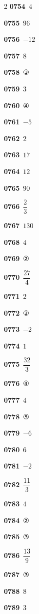 \documentclass[10pt,a4paper]{article}
\begin{document}
\begin{multicols}{2}
\noindent\textbf{0754}\ $4$\par
\noindent\textbf{0755}\ $96$\par
\noindent\textbf{0756}\ $-12$\par
\noindent\textbf{0757}\ $8$\par
\noindent\textbf{0758}\ ③\par
\noindent\textbf{0759}\ $3$\par
\noindent\textbf{0760}\ ④\par
\noindent\textbf{0761}\ $-5$\par
\noindent\textbf{0762}\ $2$\par
\noindent\textbf{0763}\ $17$\par
\noindent\textbf{0764}\ $12$\par
\noindent\textbf{0765}\ $90$\par
\noindent\textbf{0766}\ $\dfrac{2}{3}$\par
\noindent\textbf{0767}\ $130$\par
\noindent\textbf{0768}\ $4$\par
\noindent\textbf{0769}\ ②\par
\noindent\textbf{0770}\ $\dfrac{27}{4}$\par
\noindent\textbf{0771}\ $2$\par
\noindent\textbf{0772}\ ②\par
\noindent\textbf{0773}\ $-2$\par
\noindent\textbf{0774}\ $1$\par
\noindent\textbf{0775}\ $\dfrac{32}{3}$\par
\noindent\textbf{0776}\ ④\par
\noindent\textbf{0777}\ $4$\par
\noindent\textbf{0778}\ ⑤\par
\noindent\textbf{0779}\ $-6$\par
\noindent\textbf{0780}\ $6$\par
\noindent\textbf{0781}\ $-2$\par
\noindent\textbf{0782}\ $\dfrac{11}{3}$\par
\noindent\textbf{0783}\ $4$\par
\noindent\textbf{0784}\ ②\par
\noindent\textbf{0785}\ ③\par
\noindent\textbf{0786}\ $\dfrac{13}{9}$\par
\noindent\textbf{0787}\ ③\par
\noindent\textbf{0788}\ $8$\par
\noindent\textbf{0789}\ $3$\par

\end{multicols}
\end{document}
